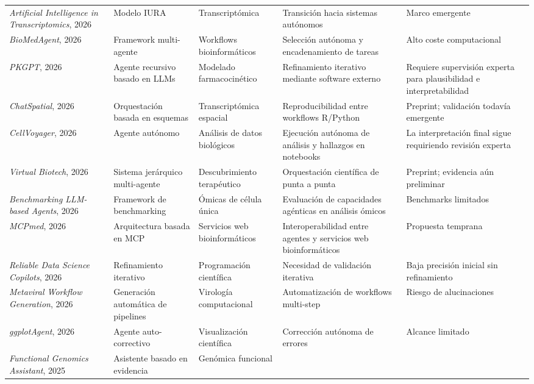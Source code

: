 \begin{longtable}{p{3.0cm} p{2.8cm} p{2.7cm} p{3.5cm} p{2.6cm}}
\textit{Artificial Intelligence in Transcriptomics}, 2026 &
Modelo IURA &
Transcriptómica &
Transición hacia sistemas autónomos &
Marco emergente \\
\addlinespace
\textit{BioMedAgent}, 2026 &
Framework multi-agente &
Workflows bioinformáticos &
Selección autónoma y encadenamiento de tareas &
Alto coste computacional \\
\addlinespace
\textit{PKGPT}, 2026 &
Agente recursivo basado en LLMs &
Modelado farmacocinético &
Refinamiento iterativo mediante software externo &
Requiere supervisión experta para plausibilidad e interpretabilidad \\
\addlinespace
\textit{ChatSpatial}, 2026 &
Orquestación basada en esquemas &
Transcriptómica espacial &
Reproducibilidad entre workflows R/Python &
Preprint; validación todavía emergente \\
\addlinespace
\textit{CellVoyager}, 2026 &
Agente autónomo &
Análisis de datos biológicos &
Ejecución autónoma de análisis y hallazgos en notebooks &
La interpretación final sigue requiriendo revisión experta \\
\addlinespace
\textit{Virtual Biotech}, 2026 &
Sistema jerárquico multi-agente &
Descubrimiento terapéutico &
Orquestación científica de punta a punta &
Preprint; evidencia aún preliminar \\
\addlinespace
\textit{Benchmarking LLM-based Agents}, 2026 &
Framework de benchmarking &
Ómicas de célula única &
Evaluación de capacidades agénticas en análisis ómicos &
Benchmarks limitados \\
\addlinespace
\textit{MCPmed}, 2026 &
Arquitectura basada en MCP &
Servicios web bioinformáticos &
Interoperabilidad entre agentes y servicios web bioinformáticos &
Propuesta temprana \\
\addlinespace
\textit{Reliable Data Science Copilots}, 2026 &
Refinamiento iterativo &
Programación científica &
Necesidad de validación iterativa &
Baja precisión inicial sin refinamiento \\
\addlinespace
\textit{Metaviral Workflow Generation}, 2026 &
Generación automática de pipelines &
Virología computacional &
Automatización de workflows multi-step &
Riesgo de alucinaciones \\
\addlinespace
\textit{ggplotAgent}, 2026 &
Agente auto-correctivo &
Visualización científica &
Corrección autónoma de errores &
Alcance limitado \\
\addlinespace
\textit{Functional Genomics Assistant}, 2025 &
Asistente basado en evidencia &
Genómica funcional &

\end{longtable}
